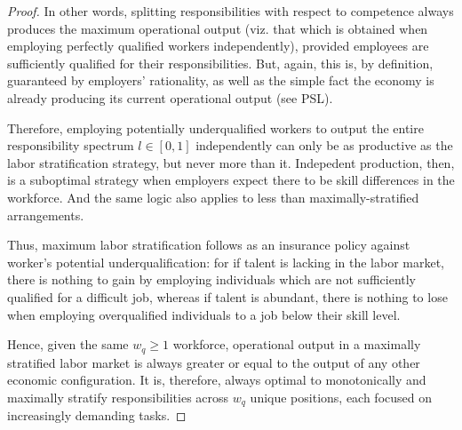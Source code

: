 \documentclass[hidelinks, nonatbib]{elsarticle}
\begin{document}
\begin{lemma}
\begin{proof}
        In other words, splitting responsibilities with respect to competence always produces the maximum operational output (viz. that which is obtained when employing perfectly qualified workers independently), provided employees are sufficiently qualified for their responsibilities. But, again, this is, by definition, guaranteed by employers' rationality, as well as the simple fact the economy is already producing its current operational output (see PSL). 
        
        Therefore, employing potentially underqualified workers to output the entire responsibility spectrum $l \in [0,1]$ independently can only be as productive as the labor stratification strategy, but never more than it. Indepedent production, then, is a suboptimal strategy when employers expect there to be skill differences in the workforce. And the same logic also applies to less than maximally-stratified arrangements.
        
        Thus, maximum labor stratification follows as an insurance policy against worker's potential underqualification: for if talent is lacking in the labor market, there is nothing to gain by employing individuals which are not sufficiently qualified for a difficult job, whereas if talent is abundant, there is nothing to lose when employing overqualified individuals to a job below their skill level.

        Hence, given the same $w_q \geq 1$ workforce, operational output in a maximally stratified labor market is always greater or equal to the output of any other economic configuration. It is, therefore, always optimal to monotonically and maximally stratify responsibilities across $w_q$ unique positions, each focused on increasingly demanding tasks.
    \end{proof}
\end{lemma}
\end{document}
